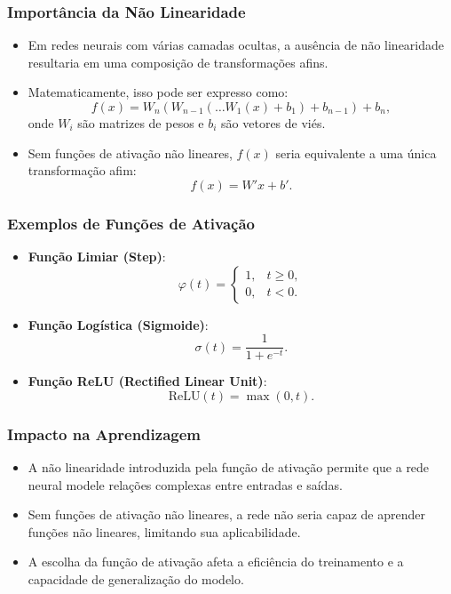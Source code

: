 \documentclass{beamer}
\begin{document}
\begin{frame}
\frametitle{Importância da Não Linearidade}
\begin{itemize}
    \item Em redes neurais com várias camadas ocultas, a ausência de não linearidade resultaria em uma composição de transformações afins.
    \item Matematicamente, isso pode ser expresso como:
    \[
    f(x) = W_n(W_{n-1}(\dots W_1(x) + b_1) + b_{n-1}) + b_n,
    \]
    onde \( W_i \) são matrizes de pesos e \( b_i \) são vetores de viés.
    \item Sem funções de ativação não lineares, \( f(x) \) seria equivalente a uma única transformação afim:
    \[
    f(x) = W'x + b'.
    \]
\end{itemize}
\end{frame}

\begin{frame}
\frametitle{Exemplos de Funções de Ativação}
\begin{itemize}
    \item \textbf{Função Limiar (Step)}:
    \[
    \varphi(t) = \begin{cases}
    1, & t \geq 0, \\
    0, & t < 0.
    \end{cases}
    \]
    \item \textbf{Função Logística (Sigmoide)}:
    \[
    \sigma(t) = \frac{1}{1 + e^{-t}}.
    \]
    \item \textbf{Função ReLU (Rectified Linear Unit)}:
    \[
    \text{ReLU}(t) = \max(0, t).
    \]
\end{itemize}
\end{frame}

\begin{frame}
\frametitle{Impacto na Aprendizagem}
\begin{itemize}
    \item A não linearidade introduzida pela função de ativação permite que a rede neural modele relações complexas entre entradas e saídas.
    \item Sem funções de ativação não lineares, a rede não seria capaz de aprender funções não lineares, limitando sua aplicabilidade.
    \item A escolha da função de ativação afeta a eficiência do treinamento e a capacidade de generalização do modelo.
\end{itemize}
\end{frame}
\end{document}
